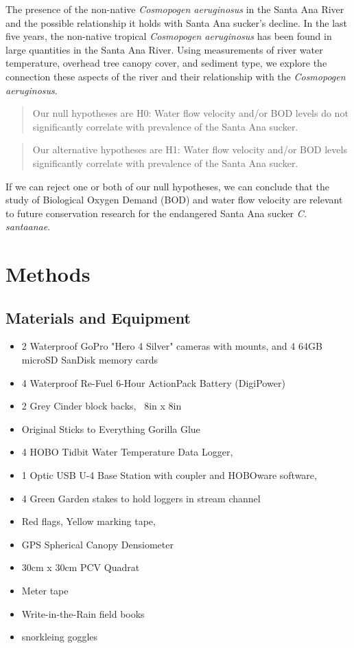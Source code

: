 \documentclass{article}\usepackage[]{graphicx}\usepackage[]{color}
\begin{document}
The presence of the non-native \emph{Cosmopogen aeruginosus} in the Santa Ana River and the possible relationship it holds with Santa Ana sucker's decline. In the last five years, the non-native tropical \emph{Cosmopogen aeruginosus} has been found in large quantities in the Santa Ana River. Using measurements of river water temperature, overhead tree canopy cover, and sediment type, we explore the connection these aspects of the river and their relationship with the \emph{Cosmopogen aeruginosus}.

\begin{quote}
Our null hypotheses are H0: Water flow velocity and/or BOD levels do not significantly correlate with prevalence of the Santa Ana sucker.
\end{quote}
\begin{quote}
Our alternative hypotheses are H1: Water flow velocity and/or BOD levels significantly correlate with prevalence of the Santa Ana sucker.
\end{quote}
If we can reject one or both of our null hypotheses, we can conclude that the study of Biological Oxygen Demand (BOD) and water flow velocity are relevant to future conservation research for the endangered Santa Ana sucker \emph{C. santaanae}.


\section{Methods}

\subsection{Materials and Equipment}
\begin{itemize}
\item 2 Waterproof GoPro "Hero 4 Silver" cameras with mounts, and 4 64GB microSD SanDisk memory cards
\item 4 Waterproof Re-Fuel 6-Hour ActionPack Battery (DigiPower)
\item 2 Grey Cinder block backs, ~8in x 8in
\item Original Sticks to Everything Gorilla Glue
\item 4 HOBO Tidbit Water Temperature Data Logger,
\item 1 Optic USB U-4 Base Station with coupler and HOBOware software,
\item 4 Green Garden stakes to hold loggers in stream channel
\item Red flags, Yellow marking tape,
\item GPS Spherical Canopy Densiometer
\item 30cm x 30cm PCV Quadrat
\item Meter tape
\item Write-in-the-Rain field books
\item snorkleing goggles 
\end{itemize}
\end{document}
